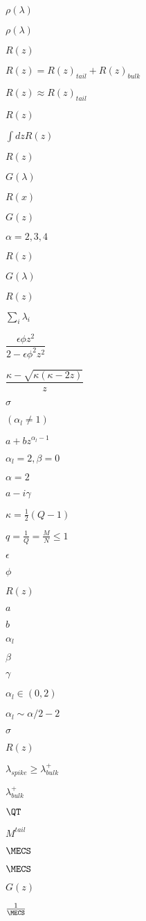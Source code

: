 $\rho(\lambda)$

$\rho(\lambda)$

$R(z)$

$R(z)=R(z)_{tail}+R(z)_{bulk}$

$R(z)\approx R(z)_{tail}$

$R(z)$

$\int dz R(z)$

$R(z)$

$G(\lambda)$

$R(x)$

$G(z)$

$\alpha=2,3,4$

$R(z)$

$G(\lambda)$

$R(z)$

$\sum_{i}\lambda_{i}$

$\dfrac{\epsilon\phi z^2}{2 - \epsilon\phi^2 z^2}$

$\dfrac{\kappa-\sqrt{\kappa(\kappa-2z)}}{z}$

$\sigma$

$(\alpha_{l}\ne 1)$

$a+bz^{\alpha_{l}-1}$

$\alpha_{l}=2, \beta=0$

$\alpha=2$

$a - i\gamma$

$\kappa=\frac{1}{2}(Q-1)$

$q=\frac{1}{Q}=\frac{M}{N}\le 1$

$\epsilon$

$\phi$

$R(z)$

$a$

$b$

$\alpha_{l}$

$\beta$

$\gamma$

$\alpha_{l}\in (0,2)$

$\alpha_{l}\sim\alpha/2-2$

$\sigma$

$R(z)$

$\lambda_{spike}\ge \lambda^{+}_{bulk}$

$\lambda^{+}_{bulk}$

$\QT$

$M^{tail}$

$\MECS$

$\MECS$

$G(z)$

$\tfrac{1}{\MECS}$

